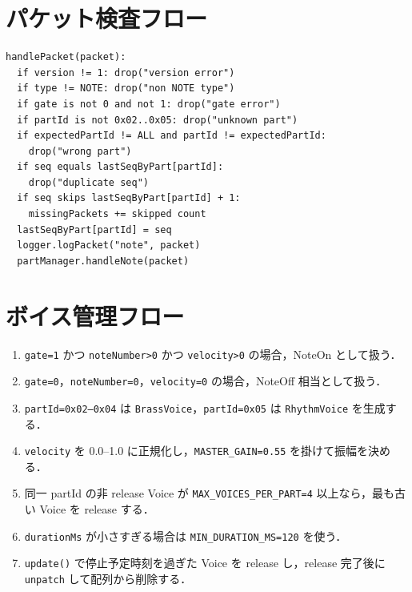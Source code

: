 \documentclass[lualatex,book,openany,paper=a4paper,jafontsize=11.5pt,jafontscale=1.05]{jlreq}
\begin{document}
\section{パケット検査フロー}
\begin{lstlisting}[style=pseudo, caption={handlePacket の検査フロー}, label={lst:packet-flow}]
handlePacket(packet):
  if version != 1: drop("version error")
  if type != NOTE: drop("non NOTE type")
  if gate is not 0 and not 1: drop("gate error")
  if partId is not 0x02..0x05: drop("unknown part")
  if expectedPartId != ALL and partId != expectedPartId:
    drop("wrong part")
  if seq equals lastSeqByPart[partId]:
    drop("duplicate seq")
  if seq skips lastSeqByPart[partId] + 1:
    missingPackets += skipped count
  lastSeqByPart[partId] = seq
  logger.logPacket("note", packet)
  partManager.handleNote(packet)
\end{lstlisting}

\section{ボイス管理フロー}
\begin{enumerate}
  \item \texttt{gate=1} かつ \texttt{noteNumber>0} かつ \texttt{velocity>0} の場合，NoteOn として扱う．
  \item \texttt{gate=0}，\texttt{noteNumber=0}，\texttt{velocity=0} の場合，NoteOff 相当として扱う．
  \item \texttt{partId=0x02--0x04} は \texttt{BrassVoice}，\texttt{partId=0x05} は \texttt{RhythmVoice} を生成する．
  \item \texttt{velocity} を 0.0--1.0 に正規化し，\texttt{MASTER\_GAIN=0.55} を掛けて振幅を決める．
  \item 同一 partId の非 release Voice が \texttt{MAX\_VOICES\_PER\_PART=4} 以上なら，最も古い Voice を release する．
  \item \texttt{durationMs} が小さすぎる場合は \texttt{MIN\_DURATION\_MS=120} を使う．
  \item \texttt{update()} で停止予定時刻を過ぎた Voice を release し，release 完了後に \texttt{unpatch} して配列から削除する．
\end{enumerate}
\end{document}
